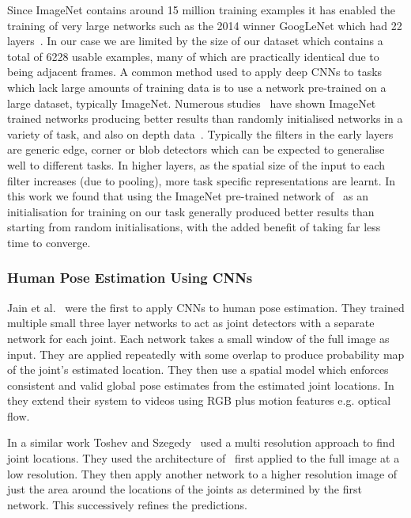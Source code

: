 \documentclass[11pt]{article} %
\begin{document}
Since ImageNet contains around 15 million training examples it has enabled the training of very large networks such as the 2014 winner GoogLeNet which had 22 layers~\cite{Szegedy2014}. In our case we are limited by the size of our dataset which contains a total of 6228 usable examples, many of which are practically identical due to being adjacent frames. A common method used to apply deep CNNs to tasks which lack large amounts of training data is to use a network pre-trained on a large dataset, typically ImageNet. Numerous studies~\cite{Sharif2014,Donahue2014,Oquab2014,Girshick2014,Yosinski2014} have shown ImageNet trained networks producing better results than randomly initialised networks in a variety of task, and also on depth data~\cite{Schwarz2015,Alexandre2013}. Typically the filters in the early layers are generic edge, corner or blob detectors which can be expected to generalise well to different tasks. In higher layers, as the spatial size of the input to each filter increases (due to pooling), more task specific representations are learnt. In this work we found that using the ImageNet pre-trained network of~\cite{Krizhevsky2012} as an initialisation for training on our task generally produced better results than starting from random initialisations, with the added benefit of taking far less time to converge.


\subsubsection{Human Pose Estimation Using CNNs}


Jain et al.~\cite{Jain2013a} were the first to apply CNNs to human pose estimation. They trained multiple small three layer networks to act as joint detectors with a separate network for each joint. Each network takes a small window of the full image as input. They are applied repeatedly with some overlap to produce probability map of the joint's estimated location. They then use a spatial model which enforces consistent and valid global pose estimates from the estimated joint locations. In~\cite{Jain2014} they extend their system to videos using RGB plus motion features e.g. optical flow. 

In a similar work Toshev and Szegedy~\cite{Toshev} used a multi resolution approach to find joint locations. They used the architecture of~\cite{Krizhevsky2012} first applied to the full image at a low resolution. They then apply another network to a higher resolution image of just the area around the locations of the joints as determined by the first network. This successively refines the predictions. 
\end{document}
